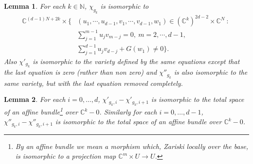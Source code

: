 \documentclass[10pt,a4paper]{amsart}
\newtheorem{lemma}{Lemma}
\newcommand{\bC}{\mathbb{C}}
\newcommand{\bN}{\mathbb{N}}
\begin{document}
\begin{lemma} \label{LemmaChiComputation}
	For each $k \in \bN$,
	$\chi_{g_k}$ is isomorphic to
	\begin{equation} \label{eqnMainChiEqn}
		\begin{aligned}
			\bC^{(d-1)N + 2k} \times \Big\{ & (u_1,\cdots,u_{d-1},v_1,\cdots,v_{d-1},w_1) \in (\bC^k)^{2d-2} \times \bC^N \ : \ \\
			                                & \sum_{j=1}^{m-1} u_j v_{m-j} = 0, \ m=2,\cdots,d-1,                               \\ &
			\sum_{j=1}^{d-1} u_j v_{d-j} + G(w_1) \neq 0
			\Big\}.
		\end{aligned}
	\end{equation}
	Also $\chi'_{g_k}$ is isomorphic to  the  variety defined by the same equations except that the last equation is zero (rather than non zero) and $\chi''_{g_k}$ is also isomorphic to the same variety, but with the last equation removed completely.
\end{lemma}

\begin{lemma} \label{lemmaStrataFibration}
	For each $i= 0,\ldots,d$,
	$\chi'_{g_k,i}-\chi'_{g_k,i+1}$ is isomorphic to the total space of an affine bundle\footnote{By an \emph{affine bundle} we mean a morphism which, Zariski locally over the base, is isomorphic to a projection map $\bC^m \times U \to U$.} over $\bC^k-0$.
	Similarly for each $i = 0,\ldots,d-1$,
	$\chi''_{g_k,i}-\chi''_{g_k,i+1}$ is isomorphic to the total space of an affine bundle over $\bC^k-0$.
\end{lemma}
\end{document}
